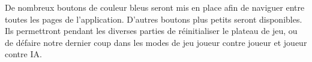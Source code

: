 De nombreux boutons de couleur bleus seront mis en place afin de naviguer entre toutes les pages de l'application. D'autres
boutons plus petits seront disponibles. Ils permettront pendant les diverses parties de réinitialiser le plateau de jeu, ou de défaire 
notre dernier coup dans les modes de jeu joueur contre joueur et joueur contre IA.